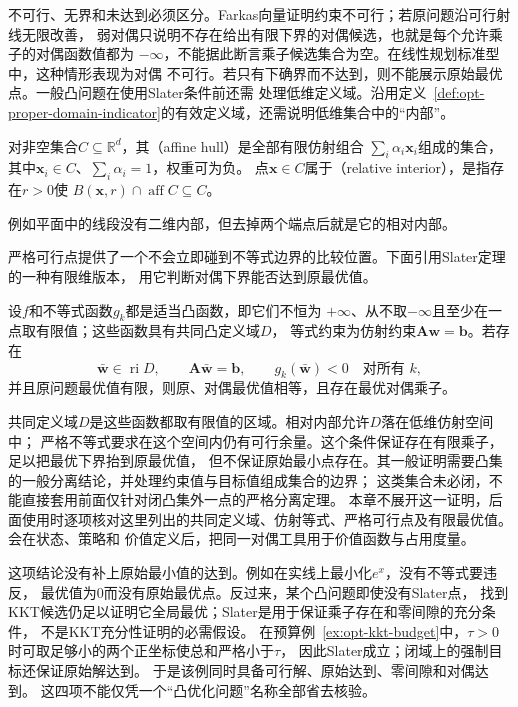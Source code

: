 不可行、无界和未达到必须区分。Farkas向量证明约束不可行；若原问题沿可行射线无限改善，
弱对偶只说明不存在给出有限下界的对偶候选，也就是每个允许乘子的对偶函数值都为
$-\infty$，不能据此断言乘子候选集合为空。在线性规划标准型中，这种情形表现为对偶
不可行。若只有下确界而不达到，则不能展示原始最优点。一般凸问题在使用Slater条件前还需
处理低维定义域。沿用定义~\ref{def:opt-proper-domain-indicator}的有效定义域，还需说明低维集合中的“内部”。
\begin{definition}[仿射包与相对内部]
\label{def:opt-affine-hull-relative-interior}
对非空集合$C\subseteq\mathbb R^d$，其（affine hull）是全部有限仿射组合
$\sum_i\alpha_i\bm x_i$组成的集合，其中$\bm x_i\in C$、$\sum_i\alpha_i=1$，权重可为负。
点$\bm x\in C$属于（relative interior），是指存在$r>0$使
$B(\bm x,r)\cap\operatorname{aff}C\subseteq C$。
\end{definition}

例如平面中的线段没有二维内部，但去掉两个端点后就是它的相对内部。

严格可行点提供了一个不会立即碰到不等式边界的比较位置。下面引用Slater定理的一种有限维版本，
用它判断对偶下界能否达到原最优值。
\begin{theorem}[Slater条件下的强对偶]
设$f$和不等式函数$g_k$都是适当凸函数，即它们不恒为
$+\infty$、从不取$-\infty$且至少在一点取有限值；这些函数具有共同凸定义域$D$，
等式约束为仿射约束$\bm{A}\bm{w}=\bm{b}$。若存在
\[
  \bar{\bm{w}}\in\operatorname{ri}D,\qquad
  \bm{A}\bar{\bm{w}}=\bm{b},\qquad
  g_k(\bar{\bm{w}})<0\quad\text{对所有 }k,
\]
并且原问题最优值有限，则原、对偶最优值相等，且存在最优对偶乘子。
\end{theorem}
共同定义域$D$是这些函数都取有限值的区域。相对内部允许$D$落在低维仿射空间中；
严格不等式要求在这个空间内仍有可行余量。这个条件保证存在有限乘子，足以把最优下界抬到原最优值，
但不保证原始最小点存在。其一般证明需要凸集的一般分离结论，并处理约束值与目标值组成集合的边界；
这类集合未必闭，不能直接套用前面仅针对闭凸集外一点的严格分离定理。
本章不展开这一证明，后面使用时逐项核对这里列出的共同定义域、仿射等式、严格可行点及有限最优值。会在状态、策略和
价值定义后，把同一对偶工具用于价值函数与占用度量。

这项结论没有补上原始最小值的达到。例如在实线上最小化$e^x$，没有不等式要违反，
最优值为$0$而没有原始最优点。反过来，某个凸问题即使没有Slater点，
找到KKT候选仍足以证明它全局最优；Slater是用于保证乘子存在和零间隙的充分条件，
不是KKT充分性证明的必需假设。
在预算例~\ref{ex:opt-kkt-budget}中，$\tau>0$时可取足够小的两个正坐标使总和严格小于$\tau$，
因此Slater成立；闭域上的强制目标还保证原始解达到。
于是该例同时具备可行解、原始达到、零间隙和对偶达到。
这四项不能仅凭一个“凸优化问题”名称全部省去核验。

